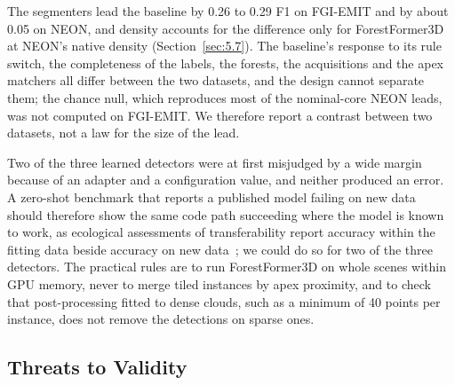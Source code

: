 \documentclass[journal]{IEEEtran}
\begin{document}
The segmenters lead the baseline by 0.26 to 0.29 F1 on FGI-EMIT and by about
0.05 on NEON, and density accounts for the difference only for ForestFormer3D at
NEON's native density (Section~\ref{sec:5.7}). The baseline's response to its rule switch,
the completeness of the labels, the forests, the acquisitions and the apex
matchers all differ between the two datasets, and the design cannot separate
them; the chance null, which reproduces most of the nominal-core NEON leads, was
not computed on FGI-EMIT. We therefore report a contrast between two datasets,
not a law for the size of the lead.

Two of the three learned detectors were at first misjudged by a wide margin
because of an adapter and a configuration value, and neither produced an error.
A zero-shot benchmark that reports a published model failing on new data should
therefore show the same code path succeeding where the model is known to work,
as ecological assessments of transferability report accuracy within the fitting
data beside accuracy on new data~\cite{wenger2012assessing,yates2018outstanding};
we could do so for two of the three detectors. The practical rules are to run
ForestFormer3D on whole scenes within GPU memory, never to merge tiled instances
by apex proximity, and to check that post-processing fitted to dense clouds,
such as a minimum of 40 points per instance, does not remove the detections on
sparse ones.

\subsection{Threats to Validity}\label{sec:6.4}
\end{document}
